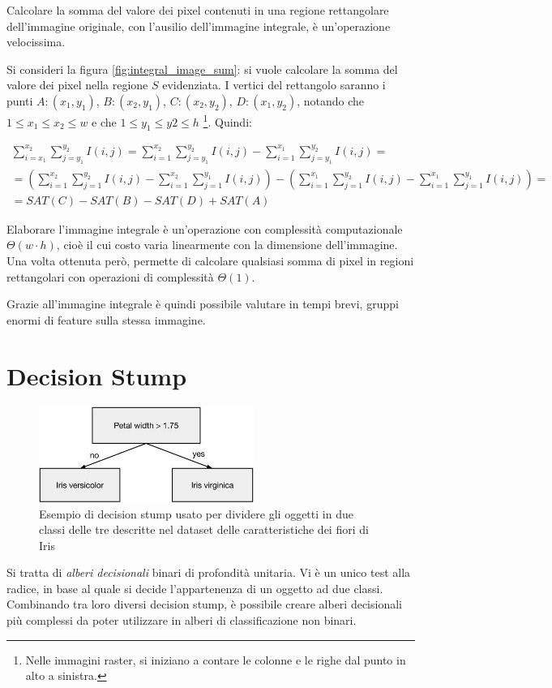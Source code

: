 Calcolare la somma del valore dei pixel contenuti in una regione rettangolare dell'immagine originale, con l'ausilio dell'immagine integrale, è un'operazione velocissima.

Si consideri la figura \ref{fig:integral_image_sum}: si vuole calcolare la somma del valore dei pixel nella regione $S$ evidenziata. I vertici del rettangolo saranno i punti $A:(x_1,y_1)$, $B:(x_2,y_1)$, $C:(x_2,y_2)$, $D:(x_1, y_2)$, notando che $1 \leq x_1 \leq x_2 \leq w$ e che $1 \leq y_1 \leq y2 \leq h$ \footnote{Nelle immagini raster, si iniziano a contare le colonne e le righe dal punto in alto a sinistra.}.
Quindi:

\begin{align*}
    \sum_{i = x_1}^{x_2} \sum_{j = y_1}^{y_2} I(i,j) =
    \sum_{i = 1}^{x_2} \sum_{j = y_1}^{y_2} I(i,j) - \sum_{i = 1}^{x_1} \sum_{j = y_1}^{y_2} I(i,j) = \\
    =
    \left(
    \sum_{i = 1}^{x_2} \sum_{j = 1}^{y_2} I(i,j) -
    \sum_{i = 1}^{x_2} \sum_{j = 1}^{y_1} I(i,j)
    \right)
    -
    \left(
    \sum_{i = 1}^{x_1} \sum_{j = 1}^{y_2} I(i,j) -
    \sum_{i = 1}^{x_1} \sum_{j = 1}^{y_1} I(i,j)
    \right) = \\
    = SAT(C) - SAT(B) - SAT(D) + SAT(A)
\end{align*}

Elaborare l'immagine integrale è un'operazione con complessità computazionale $\Theta(w \cdot h)$, cioè il cui costo varia linearmente con la dimensione dell'immagine. Una volta ottenuta però, permette di calcolare qualsiasi somma di pixel in regioni rettangolari con operazioni di complessità $\Theta(1)$.

Grazie all'immagine integrale è quindi possibile valutare in tempi brevi, gruppi enormi di feature sulla stessa immagine.


\section{Decision Stump}
\label{sec:decision_stump}
\begin{figure}
    \centering
    \includegraphics[width=7cm]{img/decision_stump.jpg}
    \caption{Esempio di decision stump usato per dividere gli oggetti in due classi delle tre descritte nel dataset delle caratteristiche dei fiori di Iris \cite{Fisher36}}
    \label{fig:decision_stump}
\end{figure}
Si tratta di \emph{alberi decisionali} binari di profondità unitaria.
Vi è un unico test alla radice, in base al quale si decide l'appartenenza di un oggetto ad due classi. Combinando tra loro diversi decision stump, è possibile creare alberi decisionali più complessi da poter utilizzare in alberi di classificazione non binari.

